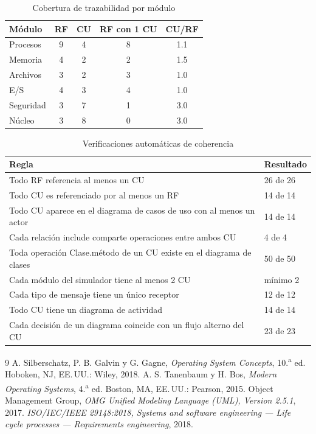 \documentclass[conference]{IEEEtran}
\begin{document}
\begin{table}[!t]
\caption{Cobertura de trazabilidad por m\'odulo}
\label{tab:cob}
\footnotesize\renewcommand{\arraystretch}{1.1}\setlength{\tabcolsep}{3pt}
\begin{tabular}{|l|c|c|c|c|}
\hline
\textbf{M\'odulo} & \textbf{RF} & \textbf{CU} & \textbf{RF con 1 CU} & \textbf{CU/RF}\\ \hline
Procesos & 9 & 4 & 8 & 1.1\\ \hline
Memoria & 4 & 2 & 2 & 1.5\\ \hline
Archivos & 3 & 2 & 3 & 1.0\\ \hline
E/S & 4 & 3 & 4 & 1.0\\ \hline
Seguridad & 3 & 7 & 1 & 3.0\\ \hline
Núcleo & 3 & 8 & 0 & 3.0\\ \hline
\end{tabular}
\end{table}

\begin{table}[!t]
\caption{Verificaciones autom\'aticas de coherencia}
\label{tab:verif}
\footnotesize\renewcommand{\arraystretch}{1.1}
\begin{tabular}{|p{5.9cm}|p{2.0cm}|}
\hline \textbf{Regla} & \textbf{Resultado}\\ \hline
Todo RF referencia al menos un CU & 26 de 26\\ \hline
Todo CU es referenciado por al menos un RF & 14 de 14\\ \hline
Todo CU aparece en el diagrama de casos de uso con al menos un actor & 14 de 14\\ \hline
Cada relación include comparte operaciones entre ambos CU & 4 de 4\\ \hline
Toda operación Clase.método de un CU existe en el diagrama de clases & 50 de 50\\ \hline
Cada módulo del simulador tiene al menos 2 CU & mínimo 2\\ \hline
Cada tipo de mensaje tiene un único receptor & 12 de 12\\ \hline
Todo CU tiene un diagrama de actividad & 14 de 14\\ \hline
Cada decisión de un diagrama coincide con un flujo alterno del CU & 23 de 23\\ \hline
\end{tabular}
\end{table}

\begin{thebibliography}{9}
 A. Silberschatz, P. B. Galvin y G. Gagne, \textit{Operating System Concepts}, 10.\textsuperscript{a} ed. Hoboken, NJ, EE.\,UU.: Wiley, 2018.
 A. S. Tanenbaum y H. Bos, \textit{Modern Operating Systems}, 4.\textsuperscript{a} ed. Boston, MA, EE.\,UU.: Pearson, 2015.
 Object Management Group, \textit{OMG Unified Modeling Language (UML), Version 2.5.1}, 2017.
 \textit{ISO/IEC/IEEE 29148:2018, Systems and software engineering --- Life cycle processes --- Requirements engineering}, 2018.
\end{thebibliography}
\end{document}
